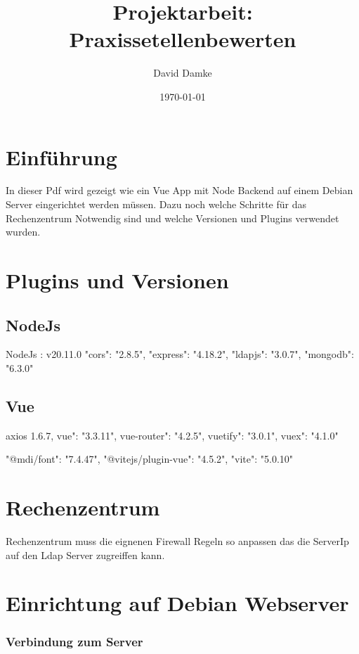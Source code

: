 \documentclass[a4paper,12pt]{article}
\begin{document}
\title{Projektarbeit: Praxissetellenbewerten}
\author{David Damke}
\date{\today}

\maketitle

\tableofcontents
\newpage

\section{Einführung}
In dieser Pdf wird gezeigt wie ein Vue App mit Node Backend auf einem Debian Server eingerichtet werden müssen. 
Dazu noch welche Schritte für das Rechenzentrum Notwendig sind und welche Versionen und Plugins verwendet wurden. 


\section{Plugins und Versionen}

\subsection{NodeJs}
NodeJs : v20.11.0
"cors": "2.8.5",
"express": "4.18.2",
"ldapjs": "3.0.7",
"mongodb": "6.3.0"


\subsection{Vue}
axios 1.6.7,
vue": "3.3.11",
vue-router": "4.2.5",
vuetify": "3.0.1",
vuex": "4.1.0"

"@mdi/font": "7.4.47",
    "@vitejs/plugin-vue": "4.5.2",
    "vite": "5.0.10"

\section{Rechenzentrum}

Rechenzentrum muss die eignenen Firewall Regeln so anpassen das die ServerIp auf den Ldap Server zugreiffen kann.




\section{Einrichtung auf Debian Webserver}

\subsubsection{Verbindung zum Server}
\end{document}
